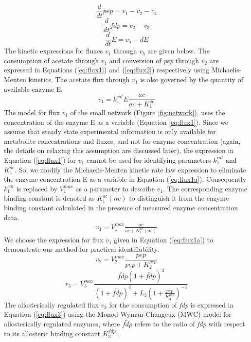 \documentclass[10pt]{article}
\begin{document}
	\begin{equation}\label{eq:ode1}
	\frac{d}{dt}pep=v_1-v_2-v_4
	\end{equation}
	\begin{equation}\label{eq:ode2}
	\frac{d}{dt}fdp=v_2-v_3
	\end{equation}
	\begin{equation}\label{eq:ode3}
	\frac{d}{dt}E=v_5 - d E
	\end{equation}
	The kinetic expressions for fluxes $v_1$ through $v_5$ are given below. The consumption of acetate through $v_1$ and conversion of \textit{pep} through $v_2$ are expressed in Equations (\ref{eq:flux1}) and (\ref{eq:flux2}) respectively using Michaelis-Menten kinetics. The acetate flux through $v_1$ is also governed by the quantity of available enzyme E. 
	\begin{equation}\label{eq:flux1}
	v_1 = k_{1}^{cat}E\frac{ac}{ac+K_{1}^{ac}}
	\end{equation}		
	The model for flux $v_1$ of the small network (Figure \ref{fig:network}), uses the concentration of the enzyme E as a variable (Equation \ref{eq:flux1}). Since we assume that steady state experimental information is only available for metabolite concentrations and fluxes, and not for enzyme concentration (again, the details on relaxing this assumption are discussed later), the expression in Equation (\ref{eq:flux1}) for $v_1$ cannot be used for identifying parameters $k_1^{cat}$ and $K_1^{ac}$. So, we modify the Michaelis-Menten kinetic rate law expression to eliminate the enzyme concentration E as a variable in Equation (\ref{eq:flux1a}). Consequently $k_1^{cat}$ is replaced by $V_1^{max}$ as a parameter to describe $v_1$. The corresponding enzyme binding constant is denoted as $K_1^{ac} (ne)$ to distinguish it from the enzyme binding constant calculated in the presence of measured enzyme concentration data.
	\begin{align}\label{eq:flux1a}
	v_1 = V_1^{max}\frac{ac}{ac+K_{1}^{ac}(ne)}
	\end{align}		
	We choose the expression for flux $v_1$ given in Equation (\ref{eq:flux1a}) to demonstrate our method for practical identifiability. 	
	\begin{equation}\label{eq:flux2}
	v_2 = V_{2}^{max}\frac{pep}{pep+K_{2}^{pep}}
	\end{equation}
	\begin{equation}\label{eq:flux3}
	v_3 = V_{3}^{max}\frac{\tilde{fdp}\left(1+\tilde{fdp}\right)^3}{\left(1+\tilde{fdp}\right)^4+L_3\left(1+\frac{pep}{K_{3}^{pep}}\right)^{-4}}
	\end{equation}
	The allosterically regulated flux $v_3$ for the consumption of \textit{fdp} is expressed in Equation (\ref{eq:flux3}) using the Monod-Wyman-Changeux (MWC) model for allosterically regulated enzymes, where $\tilde{fdp}$ refers to the ratio of \textit{fdp} with respect to its allosteric binding constant $K_{3}^{fdp}$. 
	
\end{document}
